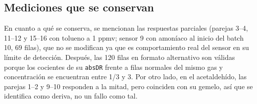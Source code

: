 \subsection{Mediciones que se conservan}

En cuanto a qué se conserva, se mencionan las respuestas parciales (parejas 3--4, 11--12 y 15--16
con tolueno a 1 ppmv; sensor 9 con amoníaco al inicio del batch 10, 69 filas), que no se modifican
ya que es comportamiento real del sensor en su límite de detección. Después, las 120 filas en
formato alternativo son válidas porque los cocientes de su \texttt{absDR} frente a filas normales
del mismo gas y concentración se encuentran entre 1/3 y 3. Por otro lado, en el acetaldehído, las
parejas 1--2 y 9--10 responden a la mitad, pero coinciden con su gemelo, así que se identifica como
deriva, no un fallo como tal.